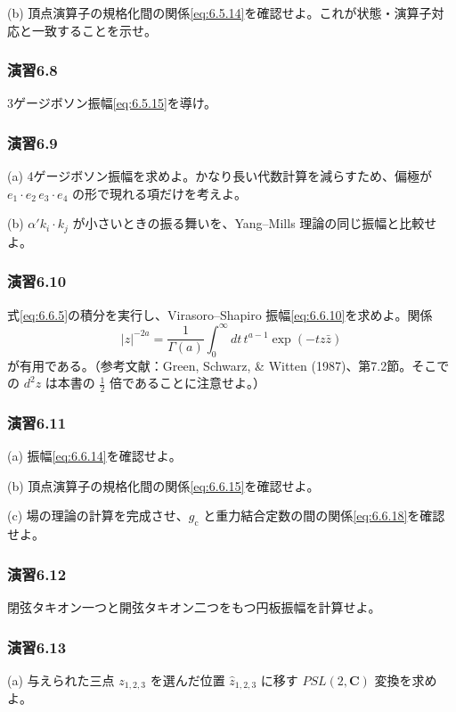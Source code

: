 (b) 頂点演算子の規格化間の関係\eqref{eq:6.5.14}を確認せよ。これが状態・演算子対応と一致することを示せ。

\subsubsection*{演習6.8}\label{ex:6.8}
3ゲージボソン振幅\eqref{eq:6.5.15}を導け。

\subsubsection*{演習6.9}\label{ex:6.9}
(a) 4ゲージボソン振幅を求めよ。かなり長い代数計算を減らすため、偏極が $e_1\cdot e_2\,e_3\cdot e_4$ の形で現れる項だけを考えよ。

(b) $\alpha'k_i\cdot k_j$ が小さいときの振る舞いを、Yang--Mills 理論の同じ振幅と比較せよ。

\subsubsection*{演習6.10}\label{ex:6.10}
式\eqref{eq:6.6.5}の積分を実行し、Virasoro--Shapiro 振幅\eqref{eq:6.6.10}を求めよ。関係
\[
|z|^{-2a}=\frac1{\Gamma(a)}\int_0^\infty dt\,t^{a-1}\exp(-tz\bar z)
\]
が有用である。（参考文献：Green, Schwarz, \& Witten (1987)\cite{Green:1987sp}、第7.2節。そこでの $d^2z$ は本書の $\tfrac12$ 倍であることに注意せよ。）

\subsubsection*{演習6.11}\label{ex:6.11}
(a) 振幅\eqref{eq:6.6.14}を確認せよ。

(b) 頂点演算子の規格化間の関係\eqref{eq:6.6.15}を確認せよ。

(c) 場の理論の計算を完成させ、$g_{\mathrm c}$ と重力結合定数の間の関係\eqref{eq:6.6.18}を確認せよ。

\subsubsection*{演習6.12}\label{ex:6.12}
閉弦タキオン一つと開弦タキオン二つをもつ円板振幅を計算せよ。

\subsubsection*{演習6.13}\label{ex:6.13}
(a) 与えられた三点 $z_{1,2,3}$ を選んだ位置 $\widehat z_{1,2,3}$ に移す $PSL(2,\mathbf C)$ 変換を求めよ。

